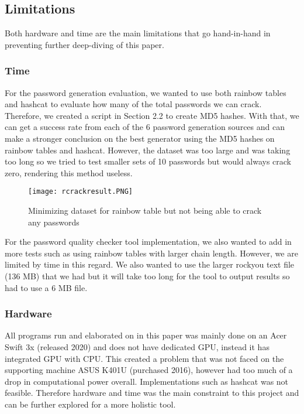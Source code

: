 \documentclass[letterpaper,twocolumn,10pt]{article}
\begin{document}
\subsection{Limitations}
Both hardware and time are the main limitations that go hand-in-hand in preventing further deep-diving of this paper.

\subsubsection{Time}
For the password generation evaluation, we wanted to use both rainbow tables and hashcat to evaluate how many of the total passwords we can crack. Therefore, we created a script in Section 2.2 to create MD5 hashes. With that, we can get a success rate from each of the 6 password generation sources and can make a stronger conclusion on the best generator using the MD5 hashes on rainbow tables and hashcat. However, the dataset was too large and was taking too long so we tried to test smaller sets of 10 passwords but would always crack zero, rendering this method useless.

\begin{figure}[H]
    \centering
    \texttt{[image: rcrackresult.PNG]}
    \caption{Minimizing dataset for rainbow table but not being able to crack any passwords}
\end{figure}

For the password quality checker tool implementation, we also wanted to add in more tests such as using rainbow tables with larger chain length. However, we are limited by time in this regard. We also wanted to use the larger rockyou text file (136 MB) that we had but it will take too long for the tool to output results so had to use a 6 MB file.

\subsubsection{Hardware}
All programs run and elaborated on in this paper was mainly done on an Acer Swift 3x (released 2020) and does not have dedicated GPU, instead it has integrated GPU with CPU. This created a problem that was not faced on the supporting machine ASUS K401U (purchased 2016), however had too much of a drop in computational power overall. Implementations such as hashcat was not feasible. Therefore hardware and time was the main constraint to this project and can be further explored for a more holistic tool.

\end{document}
